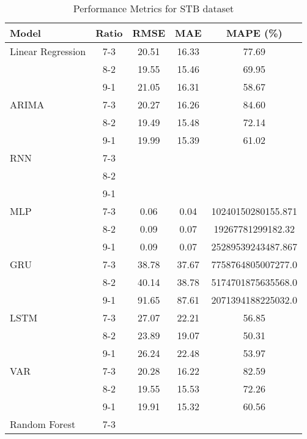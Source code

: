\begin{table}[h!]
    \centering
    \caption{Performance Metrics for STB dataset}
    \begin{tabular}{|l|c|c|c|c|}
    \hline
    \rowcolor{orange!30} \textbf{Model} & \textbf{Ratio} & \textbf{RMSE} & \textbf{MAE} & \textbf{MAPE (\%)} \\ \hline
    \rowcolor{white} Linear Regression & 7-3 & 20.51 & 16.33 & 77.69 \\ \hline
    \rowcolor{white}  & 8-2 & 19.55 & 15.46 & 69.95 \\ \hline
    \rowcolor{white}  & 9-1 & 21.05 & 16.31 & 58.67 \\ \hline
    \rowcolor{white} ARIMA & 7-3 & 20.27 & 16.26 & 84.60 \\ \hline
    \rowcolor{white}  & 8-2 & 19.49 & 15.48 & 72.14 \\ \hline
    \rowcolor{white}  & 9-1 & 19.99 & 15.39 & 61.02 \\ \hline
    \rowcolor{white} RNN & 7-3 &  &  &  \\ \hline
    \rowcolor{white}  & 8-2 &  &  &  \\ \hline
    \rowcolor{white}  & 9-1 &  &  &  \\ \hline
    \rowcolor{white} MLP & 7-3 & 0.06 & 0.04& 10240150280155.871 \\ \hline
    \rowcolor{white}  & 8-2 & 0.09 & 0.07 & 19267781299182.32 \\ \hline
    \rowcolor{white}  & 9-1 & 0.09 & 0.07& 25289539243487.867  \\ \hline
    \rowcolor{white} GRU & 7-3 & 38.78 & 37.67 & 7758764805007277.0 \\ \hline
    \rowcolor{white}  & 8-2 & 40.14 & 38.78 & 5174701875635568.0 \\ \hline
    \rowcolor{white}  & 9-1 & 91.65 & 87.61 & 2071394188225032.0 \\ \hline
    \rowcolor{white} LSTM & 7-3 & 27.07 & 22.21 & 56.85 \\ \hline
    \rowcolor{white}  & 8-2 & 23.89 & 19.07 & 50.31 \\ \hline
    \rowcolor{white}  & 9-1 & 26.24 & 22.48 & 53.97 \\ \hline
    \rowcolor{white} VAR & 7-3 & 20.28 & 16.22 & 82.59 \\ \hline
    \rowcolor{white}  & 8-2 & 19.55 & 15.53 & 72.26 \\ \hline
    \rowcolor{white}  & 9-1 & 19.91 & 15.32 & 60.56 \\ \hline
    \rowcolor{white} Random Forest & 7-3 &  &  &  \\ \hline

\end{tabular}
\end{table}
